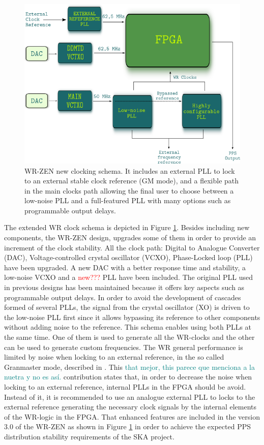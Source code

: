 \begin{figure} \centering
	\includegraphics[width=0.7\linewidth]{img/zenclkschema} \caption[WR-ZEN
	clocking schema]{WR-ZEN new clocking schema. 
	It includes an external PLL to lock to an external
	stable clock reference (GM mode), and a flexible path in the main
	clocks path allowing the final user to choose between a low-noise PLL
	and a full-featured PLL with many options such as programmable output
delays.} \label{fig:zenclkschema} \end{figure}

The extended WR clock schema is depicted in Figure \ref{fig:zenclkschema}.
Besides including new components, the WR-ZEN design, upgrades some of them
in order to provide an increment of the clock stability. All the clock path: Digital to
Analogue Converter (DAC), Voltage-controlled crystal oscillator (VCXO),
Phase-Locked loop (PLL) have been upgraded. A new DAC with a better
response time and stability, a low-noise VCXO and a \textcolor{red}{new???} PLL have been included. 
The original PLL used in previous designs has been maintained because it offers key aspects
such as programmable output delays. In order to avoid the development of cascades formed of several PLLs, the signal
from the crystal oscillator (XO) is driven to the low-noise PLL first since
it allows bypassing its reference to other components without adding noise to
the reference. This schema enables using both PLLs at the same time. One of
them is used to generate all the WR-clocks and the other can be used to
generate custom frequencies. The WR general performance is limited by noise
when locking to an external reference, in the so called Granmaster mode,
described in \cite{Rizzi2016}. This \textcolor{teal}{that mejor, this parece 
que menciona a la nuetra y no es así.} contribution states that, in
order to decrease the noise when locking to an external reference, internal
PLLs in the FPGA should be avoid. Instead of it, it is recommended to use
an analogue external PLL to locks to the external reference generating the necessary
clock signals by the internal elements of the WR-logic in the FPGA. That
enhanced features are included in the version 3.0 of the WR-ZEN as shown in
Figure \ref{fig:zenclkschema} in order to achieve the expected PPS distribution
stability requirements of the SKA project.


